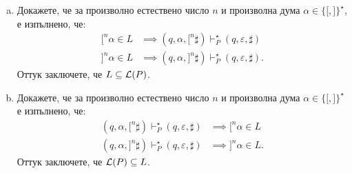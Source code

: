 \begin{extra}
\begin{example}
  \begin{enumerate}[a)]
  \item
    Докажете, че за произволно естествено число $n$ и произволна дума $\alpha \in \{\texttt{[}, \texttt{]}\}^\star$, е изпълнено, че:
    \begin{align*}
      \texttt{[}^n\alpha \in L & \implies (q, \alpha, \texttt{[}^n\sharp) \vdash^\star_P (q, \varepsilon, \sharp)\\
      \texttt{]}^n\alpha \in L & \implies (q, \alpha, \texttt{]}^n\sharp) \vdash^\star_P (q, \varepsilon, \sharp).
    \end{align*}
    Оттук заключете, че $L \subseteq \mathcal{L}(P)$.
  \item
    Докажете, че за произволно естествено число $n$ и произволна дума $\alpha \in \{\texttt{[}, \texttt{]}\}^\star$ е изпълнено, че:
    \begin{align*}
      (q, \alpha, \texttt{[}^n\sharp) \vdash^\star_P (q, \varepsilon, \sharp) & \implies \texttt{[}^n\alpha \in L\\
      (q, \alpha, \texttt{]}^n\sharp) \vdash^\star_P (q, \varepsilon, \sharp) & \implies \texttt{]}^n\alpha \in L.
    \end{align*}
    Оттук заключете, че $\mathcal{L}(P) \subseteq L$.
  \end{enumerate}
\end{example}


\end{extra}
